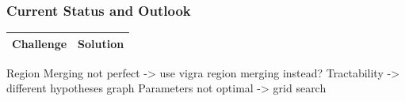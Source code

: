\begin{frame}
    \frametitle{Current Status and Outlook}
    \begin{tabular}{ll}
        Challenge & Solution \\ \midrule
    \end{tabular}
    
    Region Merging not perfect -> use vigra region merging instead?
    Tractability -> different hypotheses graph
    Parameters not optimal -> grid search
\end{frame}



